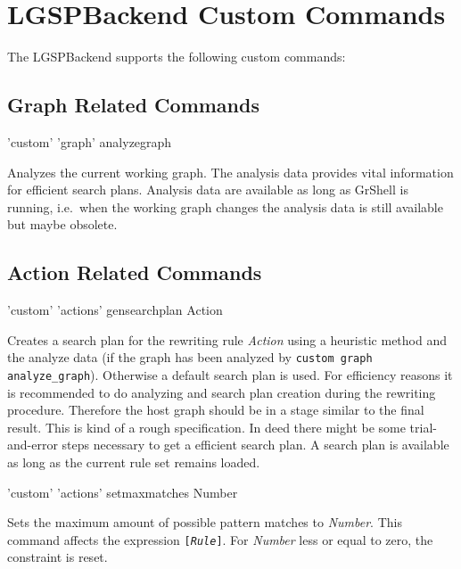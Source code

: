 \section{LGSPBackend Custom Commands}
\label{custom}
The LGSPBackend supports the following custom commands:

\subsection{Graph Related Commands}
\begin{rail}
  'custom' 'graph' analyzegraph
\end{rail}
Analyzes the current working graph. The analysis data provides vital information for efficient search plans. Analysis data are available as long as GrShell is running, i.e.\ when the working graph changes the analysis data is still available but maybe obsolete.

\subsection{Action Related Commands}
\begin{rail}
  'custom' 'actions' gensearchplan Action
\end{rail}
Creates a search plan for the rewriting rule \emph{Action} using a heuristic method and the analyze data (if the graph has been analyzed by \texttt{custom graph analyze\_graph}). Otherwise a default search plan is used. For efficiency reasons it is recommended to do analyzing and search plan creation during the rewriting procedure. Therefore the host graph should be in a stage similar to the final result. This is kind of a rough specification. In deed there might be some trial-and-error steps necessary to get a efficient search plan. A search plan is available as long as the current rule set remains loaded. 

\begin{rail}
  'custom' 'actions' setmaxmatches Number
\end{rail}
Sets the maximum amount of possible pattern matches to \emph{Number}. This command affects the expression \texttt{[\emph{Rule}]}. For \emph{Number} less or equal to zero, the constraint is reset.
 